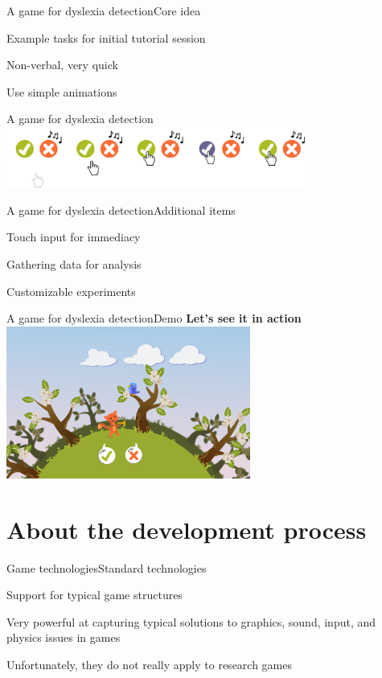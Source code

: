 \documentclass{beamer}
\begin{document}
\begin{slide}{A game for dyslexia detection}{Core idea}{
\item Example tasks for initial tutorial session
\item Non-verbal, very quick
\item Use simple animations
}\end{slide}

\begin{frame}{A game for dyslexia detection}
\center
\includegraphics[width=10cm]{Pics/animated_buttons.png}
\end{frame}

\begin{slide}{A game for dyslexia detection}{Additional items}{
\item Touch input for immediacy
\pause
\item Gathering data for analysis
\pause
\item Customizable experiments
}\end{slide}

\begin{textslide}{A game for dyslexia detection}{Demo}{
\textbf{Let's see it in action}
\center
\includegraphics[height=5cm]{Pics/full_view.png}
}\end{textslide}

\section{About the development process}
\begin{slide}{Game technologies}{Standard technologies}{
\item Support for typical game structures
\item Very powerful at capturing typical solutions to graphics, sound, input, and physics issues in games
\pause
\item Unfortunately, they do not really apply to research games
}\end{slide}
\end{document}
